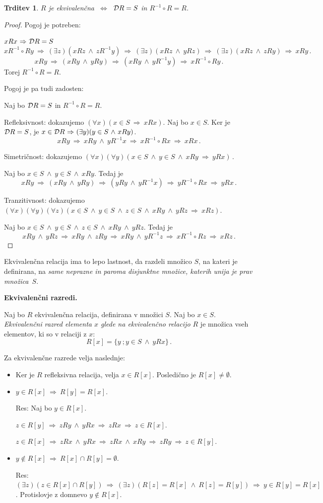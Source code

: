 \documentclass[11pt,paper=b5,footinclude,headinclude]{scrbook} %
\def\inn {{~\wedge~}}
\def\sledi {{~\Rightarrow~}}
\def\cee {{~\Leftrightarrow~}}
\newtheorem*{trditev}{Trditev}
\begin{document}
\begin{trditev}
$R$ je ekvivalenčna $\cee$ ${\cal D}R = S$ in $R^{-1}\circ R = R$.
\end{trditev}

\begin{proof}
Pogoj je potreben:

$xRx \sledi {\cal D}R = S$
$$xR^{-1}\circ Ry \sledi (\exists z)(xRz \inn zR^{-1}y)
\sledi (\exists z)(xRz \inn yRz)
\sledi (\exists z)(xRz \inn zRy)
\sledi xRy\,.$$
$$xRy
\sledi (xRy\inn yRy)
\sledi (xRy\inn yR^{-1}y)
\sledi xR^{-1}\circ Ry\,.$$
Torej $R^{-1}\circ R = R$.

Pogoj je pa tudi zadosten:

Naj bo ${\cal D}R = S$ in $R^{-1}\circ R = R$.

Refleksivnost: dokazujemo $(\forall x)(x\in S\sledi xRx)$.
Naj bo $x\in S$. Ker je ${\cal D}R = S$,
je $x\in {\cal D}R\sledi (\exists y)(y\in S\inn xRy)$.
$$xRy
\sledi xRy\inn yR^{-1}x
\sledi x R^{-1}\circ R x
\sledi xRx\,.$$

Simetričnost: dokazujemo $(\forall x)(\forall y)(x\in S\inn y\in S\inn xRy\sledi yRx)\,.$

Naj bo $x\in S\inn y\in S\inn xRy$.
Tedaj je
$$xRy \sledi (xRy\inn yRy)
\sledi (yRy\inn yR^{-1}x)
\sledi yR^{-1}\circ Rx
\sledi yRx\,.$$

Tranzitivnost: dokazujemo $(\forall x)(\forall y)(\forall z)(x\in S\inn y\in S\inn z\in S\inn xRy\inn yRz\sledi xRz).$

Naj bo $x\in S\inn y\in S\inn z\in S\inn xRy\inn yRz$.
Tedaj je
$$xRy \inn yRz \sledi xRy\inn zRy
\sledi xRy\inn yR^{-1}z
\sledi xR^{-1}\circ Rz
\sledi xRz\,.$$
\end{proof}

\medskip
Ekvivalenčna relacija ima to lepo lastnost, da razdeli množico $S$, na kateri je definirana, na {\em same neprazne in paroma disjunktne množice, katerih unija
je prav množica~$S$}.

\medskip
\textbf{ Ekvivalenčni razredi.}

Naj bo $R$ ekvivalenčna relacija, definirana v množici $S$. Naj bo $x\in S$. {\em Ekvivalenčni razred elementa $x$ glede na ekvivalenčno relacijo $R$} je množica vseh elementov, ki so v relaciji z $x$:
$$R[x] = \{y~;y\in S \inn yRx\}\,.$$

Za ekvivalenčne razrede velja naslednje:
\begin{itemize}
  \item Ker je $R$ refleksivna relacija, velja $x\in R[x]$. Posledično je $R[x]\neq \emptyset$.
  \item $y\in R[x]\sledi R[y]=R[x]$.

  Res: Naj bo $y\in R[x]$.

  $z\in R[y]\sledi zRy\inn yRx\sledi zRx\sledi z\in R[x]$.

  $z\in R[x]\sledi zRx\inn yRx\sledi zRx\inn xRy \sledi zRy\sledi z\in R[y]$.
  \item $y\not\in R[x]\sledi R[x]\cap R[y]=\emptyset$.

  Res: $(\exists z)(z\in R[x]\cap R[y])\sledi (\exists z)(R[z] = R[x]\inn R[z] = R[y])\sledi
  y\in R[y]=R[x]$. Protislovje z domnevo $y\not\in R[x]$.
  \end{itemize}
\end{document}
